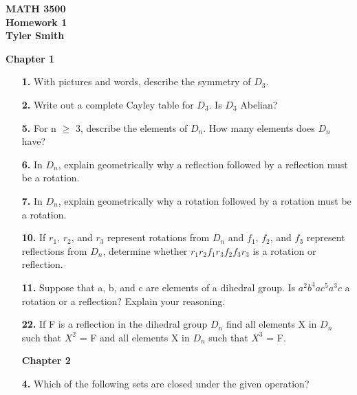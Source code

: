 \documentclass[12pt, crop, tikz]{report}
\begin{document}
\begin{center}
    \Large \textbf{MATH 3500}\\
    \Large\textbf{Homework 1}\\
    \Large \textbf{Tyler Smith}
\end{center}

\begin{center}
{\bf Chapter 1}
\end{center}

\begin{enumerate}
    \item[{\bf 1.}] With pictures and words, describe the symmetry of $D_3$.
    
    \item[{\bf 2.}] Write out a complete Cayley table for $D_3$. Is $D_3$ Abelian?
    
    \item[{\bf 5.}] For n $\geq$ 3, describe the elements of $D_n$. How many elements does $D_n$ have?
    
    \item[{\bf 6.}] In $D_n$, explain geometrically why a reflection followed by a reflection must be a rotation.
    
    \item[{\bf 7.}] In $D_n$, explain geometrically why a rotation followed by a rotation must be a rotation.
    
    \item[{\bf 10.}] If $r_1$, $r_2$, and $r_3$ represent rotations from $D_n$ and $f_1$, $f_2$, and $f_3$ represent reflections from $D_n$, determine whether $r_1 r_2 f_1 r_3 f_2 f_3 r_3$ is a rotation or reflection.
    
    \item[{\bf 11.}] Suppose that a, b, and c are elements of a dihedral group. Is $a^2 b^4 a c^5 a^3 c$ a rotation or a reflection? Explain your reasoning.
    
    \item[{\bf 22.}] If F is a reflection in the dihedral group $D_n$ find all elements X in $D_n$ such that $X^2$ = F and all elements X in $D_n$ such that $X^3$ = F.
     
     \begin{center}
         {\bf Chapter 2}
     \end{center}
     
     \item[{\bf 4.}] Which of the following sets are closed under the given operation?
     

\end{enumerate}
\end{document}
